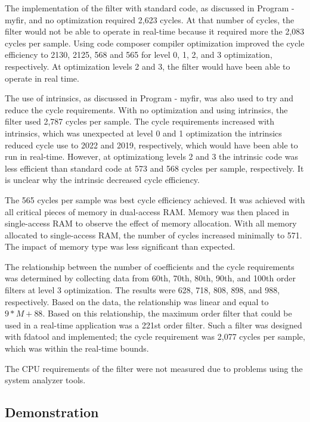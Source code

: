 \documentclass[11pt,pdftex,portrait,letterpaper]{article}
\begin{document}
The implementation of the filter with standard code, as discussed in Program - myfir, and no optimization required 2,623 cycles. At that number of cycles, the filter would not be able to operate in real-time because it required more the 2,083 cycles per sample. Using code composer compiler optimization improved the cycle efficiency to 2130, 2125, 568 and 565 for level 0, 1, 2, and 3 optimization, respectively. At optimization levels 2 and 3, the filter would have been able to operate in real time.

The use of intrinsics, as discussed in Program - myfir, was also used to try and reduce the cycle requirements. With no optimization and using intrinsics, the filter used 2,787 cycles per sample. The cycle requirements increased with intrinsics, which was unexpected at level 0 and 1 optimization the intrinsics reduced cycle use to 2022 and 2019, respectively, which would have been able to run in real-time. However, at optimizationg levels 2 and 3 the intrinsic code was less efficient than standard code at 573 and 568 cycles per sample, respectively. It is unclear why the intrinsic decreased cycle efficiency.

The 565 cycles per sample was best cycle efficiency achieved. It was achieved with all critical pieces of memory in dual-access RAM. Memory was then placed in single-access RAM to observe the effect of memory allocation. With all memory allocated to single-access RAM, the number of cycles increased minimally to 571. The impact of memory type was less significant than expected. 

The relationship between the number of coefficients and the cycle requirements was determined by collecting data from 60th, 70th, 80th, 90th, and 100th order filters at level 3 optimization. The results were 628, 718, 808, 898, and 988, respectively. Based on the data, the relationship was linear and equal to \(9*M + 88\). Based on this relationship, the maximum order filter that could be used in a real-time application was a 221st order filter. Such a filter was designed with fdatool and implemented; the cycle requirement was 2,077 cycles per sample, which was within the real-time bounds. 

The CPU requirements of the filter were not measured due to problems using the system analyzer tools.

\subsection{Demonstration}
\end{document}
